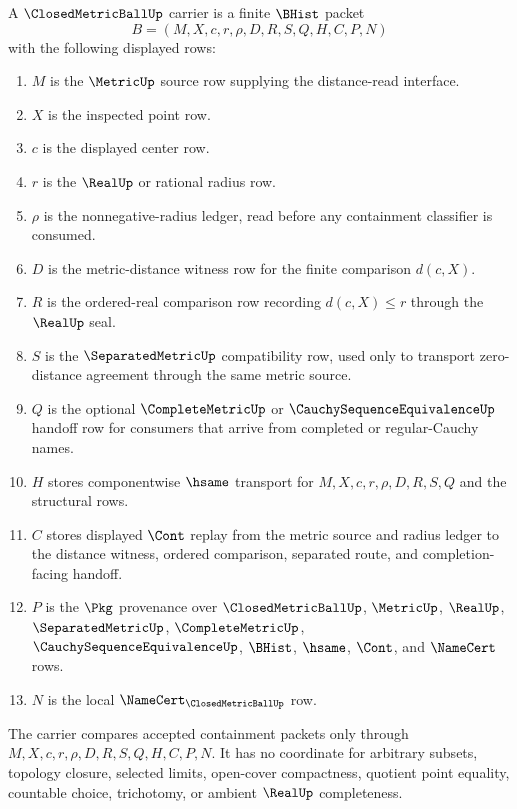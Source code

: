 \begin{definition}
\label{def:closed-metric-ball-carrier}
A $\ClosedMetricBallUp$ carrier is a finite $\BHist$ packet
$$
B=(M,X,c,r,\rho,D,R,S,Q,H,C,P,N)
$$
with the following displayed rows:
\begin{enumerate}
\item $M$ is the $\MetricUp$ source row supplying the distance-read interface.
\item $X$ is the inspected point row.
\item $c$ is the displayed center row.
\item $r$ is the $\RealUp$ or rational radius row.
\item $\rho$ is the nonnegative-radius ledger, read before any containment classifier is consumed.
\item $D$ is the metric-distance witness row for the finite comparison $d(c,X)$.
\item $R$ is the ordered-real comparison row recording $d(c,X)\leq r$ through the $\RealUp$ seal.
\item $S$ is the $\SeparatedMetricUp$ compatibility row, used only to transport zero-distance agreement through the same metric source.
\item $Q$ is the optional $\CompleteMetricUp$ or $\CauchySequenceEquivalenceUp$ handoff row for consumers that arrive from completed or regular-Cauchy names.
\item $H$ stores componentwise $\hsame$ transport for $M,X,c,r,\rho,D,R,S,Q$ and the structural rows.
\item $C$ stores displayed $\Cont$ replay from the metric source and radius ledger to the distance witness, ordered comparison, separated route, and completion-facing handoff.
\item $P$ is the $\Pkg$ provenance over $\ClosedMetricBallUp$, $\MetricUp$, $\RealUp$, $\SeparatedMetricUp$, $\CompleteMetricUp$, $\CauchySequenceEquivalenceUp$, $\BHist$, $\hsame$, $\Cont$, and $\NameCert$ rows.
\item $N$ is the local $\NameCert_{\ClosedMetricBallUp}$ row.
\end{enumerate}
The carrier compares accepted containment packets only through $M,X,c,r,\rho,D,R,S,Q,H,C,P,N$. It has no coordinate for arbitrary subsets, topology closure, selected limits, open-cover compactness, quotient point equality, countable choice, trichotomy, or ambient $\RealUp$ completeness.
\end{definition}

